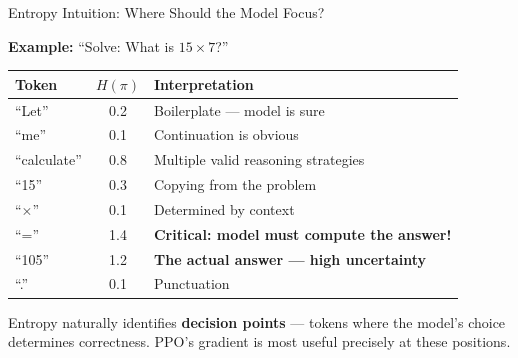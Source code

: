 \documentclass[aspectratio=169,10pt]{beamer}
\begin{document}
\begin{frame}{Entropy Intuition: Where Should the Model Focus?}

\textbf{Example:} ``Solve: What is $15 \times 7$?''

\vspace{0.2cm}
\begin{center}
\begin{tabular}{lcl}
\toprule
Token & $H(\pi)$ & Interpretation \\
\midrule
``Let'' & 0.2 & Boilerplate --- model is sure \\
``me'' & 0.1 & Continuation is obvious \\
``calculate'' & 0.8 & Multiple valid reasoning strategies \\
``15'' & 0.3 & Copying from the problem \\
``$\times$'' & 0.1 & Determined by context \\
``='' & \alert{1.4} & \textbf{Critical: model must compute the answer!} \\
``105'' & \alert{1.2} & \textbf{The actual answer --- high uncertainty} \\
``.'' & 0.1 & Punctuation \\
\bottomrule
\end{tabular}
\end{center}

\vspace{0.2cm}
Entropy naturally identifies \textbf{decision points} --- tokens where the model's choice determines correctness. PPO's gradient is most useful precisely at these positions.
\end{frame}
\end{document}
